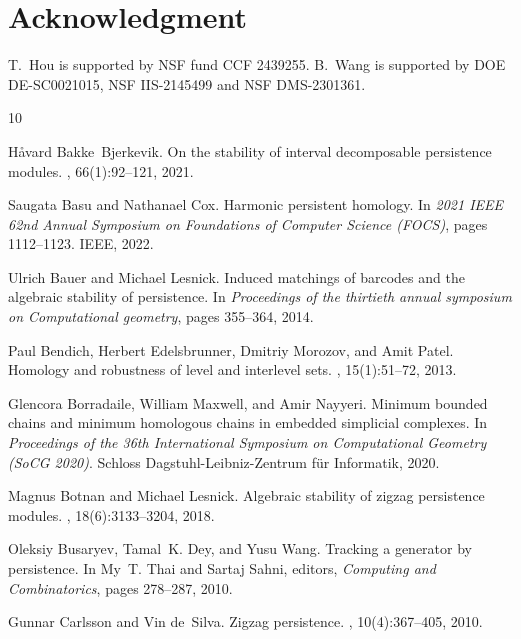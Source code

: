 \section*{Acknowledgment}
T.\ Hou is supported by NSF fund CCF 2439255. B.\ Wang is supported by DOE DE-SC0021015, NSF IIS-2145499 and NSF DMS-2301361. 
\begin{thebibliography}{10}

H{\aa}vard Bakke~Bjerkevik.
\newblock On the stability of interval decomposable persistence modules.
, 66(1):92--121, 2021.

Saugata Basu and Nathanael Cox.
\newblock Harmonic persistent homology.
\newblock In {\em 2021 IEEE 62nd Annual Symposium on Foundations of Computer
  Science (FOCS)}, pages 1112--1123. IEEE, 2022.

Ulrich Bauer and Michael Lesnick.
\newblock Induced matchings of barcodes and the algebraic stability of
  persistence.
\newblock In {\em Proceedings of the thirtieth annual symposium on
  Computational geometry}, pages 355--364, 2014.

Paul Bendich, Herbert Edelsbrunner, Dmitriy Morozov, and Amit Patel.
\newblock Homology and robustness of level and interlevel sets.
, 15(1):51--72, 2013.

Glencora Borradaile, William Maxwell, and Amir Nayyeri.
\newblock Minimum bounded chains and minimum homologous chains in embedded
  simplicial complexes.
\newblock In {\em Proceedings of the 36th International Symposium on
  Computational Geometry (SoCG 2020)}. Schloss Dagstuhl-Leibniz-Zentrum f{\"u}r
  Informatik, 2020.

Magnus Botnan and Michael Lesnick.
\newblock Algebraic stability of zigzag persistence modules.
, 18(6):3133--3204, 2018.

Oleksiy Busaryev, Tamal~K. Dey, and Yusu Wang.
\newblock Tracking a generator by persistence.
\newblock In My~T. Thai and Sartaj Sahni, editors, {\em Computing and
  Combinatorics}, pages 278--287, 2010.

Gunnar Carlsson and Vin de~Silva.
\newblock Zigzag persistence.
, 10(4):367--405, 2010.


\end{thebibliography}
